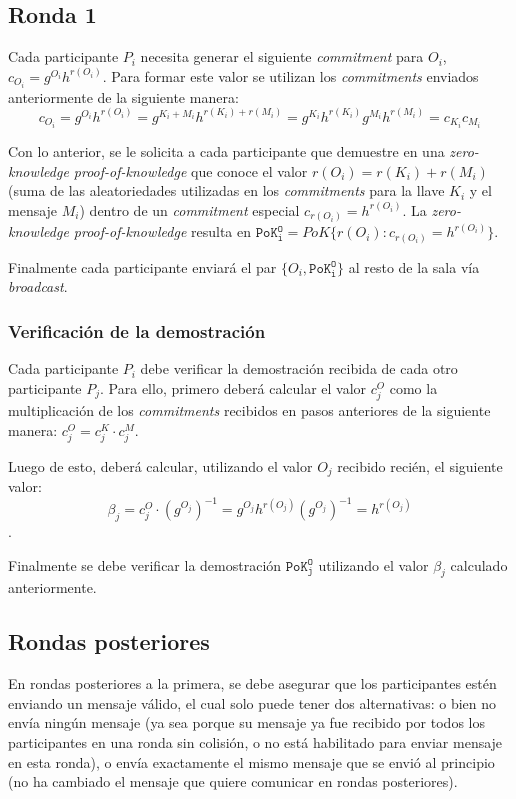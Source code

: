 \subsection{Ronda 1}

Cada participante $P_i$ necesita generar el siguiente \emph{commitment} para 
$O_i$, $c_{O_i} = g^{O_i} h^{r(O_i)}$. Para formar este valor se utilizan los 
\emph{commitments} enviados anteriormente de la siguiente manera: 
$$c_{O_i} = g^{O_i} h^{r(O_i)} = g^{K_i + M_i} h^{r(K_i) + r(M_i)} = g^{K_i} 
h^{r(K_i)} g^{M_i} h^{r(M_i)} = c_{K_i} c_{M_i}$$

Con lo anterior, se le solicita a cada participante que demuestre en una 
\emph{zero-knowledge proof-of-knowledge} que conoce el valor 
$r(O_i) = r(K_i) + r(M_i)$ (suma de las aleatoriedades utilizadas en los 
\emph{commitments} para la llave $K_i$ y el mensaje $M_i$) dentro de un 
\emph{commitment} especial $c_{r(O_i)} = h^{r(O_i)}$. La 
\emph{zero-knowledge proof-of-knowledge} resulta en 
$\mathtt{PoK_i^O} = PoK\{r(O_i) : c_{r(O_i)} = h^{r(O_i)}\}$.

Finalmente cada participante enviará el par $\{O_i, \mathtt{PoK_i^O}\}$ al 
resto de la sala vía \emph{broadcast}.

\subsubsection{Verificación de la demostración}

Cada participante $P_i$ debe verificar la demostración recibida de cada otro 
participante $P_j$. Para ello, primero deberá calcular el valor $c_j^O$ como 
la multiplicación de los \emph{commitments} recibidos en pasos anteriores de 
la siguiente manera: $c_j^O = c_j^K \cdot c_j^M$.

Luego de esto, deberá calcular, utilizando el valor $O_j$ recibido recién, el 
siguiente valor: $$\beta_j = c_j^O \cdot (g^{O_j})^{-1} = g^{O_j} h^{r(O_j)} 
(g^{O_j})^{-1} = h^{r(O_j)}$$.

Finalmente se debe verificar la demostración $\mathtt{PoK_j^O}$ utilizando el 
valor $\beta_j$ calculado anteriormente.

\subsection{Rondas posteriores}

En rondas posteriores a la primera, se debe asegurar que los participantes 
estén enviando un mensaje válido, el cual solo puede tener dos alternativas: o 
bien no envía ningún mensaje (ya sea porque su mensaje ya fue recibido por 
todos los participantes en una ronda sin colisión, o no está habilitado para 
enviar mensaje en esta ronda), o envía exactamente el mismo mensaje que se 
envió al principio (no ha cambiado el mensaje que quiere comunicar en rondas 
posteriores).

